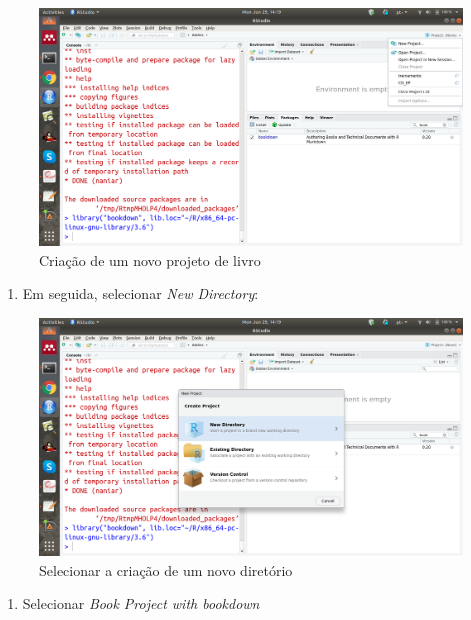 \documentclass[
]{book}
\providecommand{\tightlist}{%
  \setlength{\itemsep}{0pt}\setlength{\parskip}{0pt}}
\begin{document}
\begin{figure}
\centering
\includegraphics{fig/rstudio_select_new_Project.png}
\caption{Criação de um novo projeto de livro}
\end{figure}

\begin{enumerate}
\def\labelenumi{\arabic{enumi}.}
\setcounter{enumi}{1}
\tightlist
\item
  Em seguida, selecionar \emph{New Directory}:
\end{enumerate}

\begin{figure}
\centering
\includegraphics{fig/select_new_directory.png}
\caption{Selecionar a criação de um novo diretório}
\end{figure}

\begin{enumerate}
\def\labelenumi{\arabic{enumi}.}
\setcounter{enumi}{2}
\tightlist
\item
  Selecionar \emph{Book Project with bookdown}
\end{enumerate}
\end{document}
